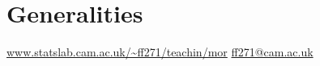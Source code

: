 \chapter{Generalities}
\label{cha:generalities}


\url{www.statslab.cam.ac.uk/~ff271/teachin/mor}
\url{ff271@cam.ac.uk}



